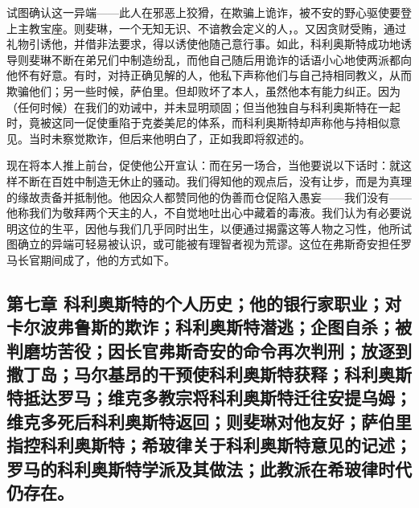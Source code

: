 试图确认这一异端——此人在邪恶上狡猾，在欺骗上诡诈，被不安的野心驱使要登上主教宝座。则斐琳，一个无知无识、不谙教会定义的人，。又因贪财受贿，通过礼物引诱他，并借非法要求，得以诱使他随己意行事。如此，科利奥斯特成功地诱导则斐琳不断在弟兄们中制造纷乱，而他自己随后用诡诈的话语小心地使两派都向他怀有好意。有时，对持正确见解的人，他私下声称他们与自己持相同教义，从而欺骗他们；另一些时候，萨伯里。但却败坏了本人，虽然他本有能力纠正。因为（任何时候）在我们的劝诫中，并未显明顽固；但当他独自与科利奥斯特在一起时，竟被这同一促使重陷于克娄美尼的体系，而科利奥斯特却声称他与持相似意见。当时未察觉欺诈，但后来他明白了，正如我即将叙述的。\par

现在将本人推上前台，促使他公开宣认：而在另一场合，当他要说以下话时：就这样不断在百姓中制造无休止的骚动。我们得知他的观点后，没有让步，而是为真理的缘故责备并抵制他。他因众人都赞同他的伪善而仓促陷入愚妄——我们没有——他称我们为敬拜两个天主的人，不自觉地吐出心中藏着的毒液。我们认为有必要说明这位的生平，因他与我们几乎同时出生，以便通过揭露这等人物之习性，他所试图确立的异端可轻易被认识，或可能被有理智者视为荒谬。这位在弗斯奇安担任罗马长官期间成了，他的方式如下。\par


\subsection{第七章 科利奥斯特的个人历史；他的银行家职业；对卡尔波弗鲁斯的欺诈；科利奥斯特潜逃；企图自杀；被判磨坊苦役；因长官弗斯奇安的命令再次判刑；放逐到撒丁岛；马尔基昂的干预使科利奥斯特获释；科利奥斯特抵达罗马；维克多教宗将科利奥斯特迁往安提乌姆；维克多死后科利奥斯特返回；则斐琳对他友好；萨伯里指控科利奥斯特；希玻律关于科利奥斯特意见的记述；罗马的科利奥斯特学派及其做法；此教派在希玻律时代仍存在。}

